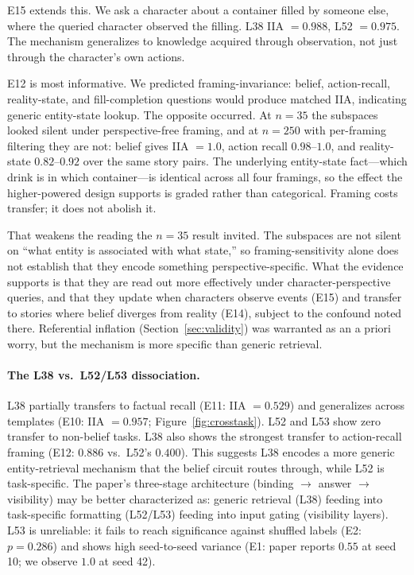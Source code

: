 \documentclass{article}
\begin{document}
E15 extends this. We ask a character about a container filled by someone else, where the queried character observed the filling. L38 IIA $= 0.988$, L52 $= 0.975$. The mechanism generalizes to knowledge acquired through observation, not just through the character's own actions.

E12 is most informative. We predicted framing-invariance: belief, action-recall, reality-state, and fill-completion questions would produce matched IIA, indicating generic entity-state lookup. The opposite occurred. At $n = 35$ the subspaces looked silent under perspective-free framing, and at $n = 250$ with
per-framing filtering they are not: belief gives IIA $= 1.0$, action recall $0.98$--$1.0$, and
reality-state $0.82$--$0.92$ over the same story pairs. The underlying entity-state
fact---which drink is in which container---is identical across all four framings, so the
effect the higher-powered design supports is graded rather than categorical. Framing costs
transfer; it does not abolish it.

That weakens the reading the $n = 35$ result invited. The subspaces are not silent on
``what entity is associated with what state,'' so framing-sensitivity alone does not
establish that they encode something perspective-specific. What the evidence supports is
that they are read out more effectively under character-perspective queries, and that they
update when characters observe events (E15) and transfer to stories where belief diverges
from reality (E14), subject to the confound noted there. Referential inflation (Section~\ref{sec:validity}) was warranted as an a priori worry, but the mechanism is more specific than generic retrieval.

\paragraph{The L38 vs.\ L52/L53 dissociation.}
L38 partially transfers to factual recall (E11: IIA $= 0.529$) and generalizes across templates (E10: IIA $= 0.957$; Figure~\ref{fig:crosstask}). L52 and L53 show zero transfer to non-belief tasks. L38 also shows the strongest transfer to action-recall framing (E12: $0.886$ vs.\ L52's $0.400$). This suggests L38 encodes a more generic entity-retrieval mechanism that the belief circuit routes through, while L52 is task-specific. The paper's three-stage architecture (binding $\to$ answer $\to$ visibility) may be better characterized as: generic retrieval (L38) feeding into task-specific formatting (L52/L53) feeding into input gating (visibility layers). L53 is unreliable: it fails to reach significance against shuffled labels (E2: $p = 0.286$) and shows high seed-to-seed variance (E1: paper reports $0.55$ at seed 10; we observe $1.0$ at seed 42).
\end{document}
